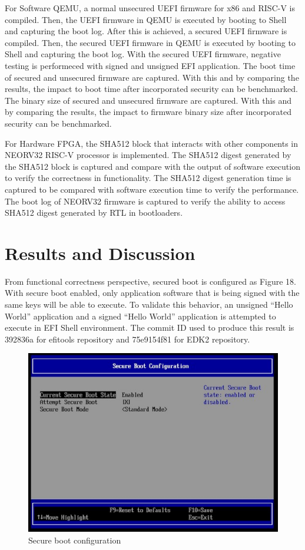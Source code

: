 \documentclass[review]{elsarticle}
\begin{document}
For Software QEMU, a normal unsecured UEFI firmware for x86 and RISC-V is compiled. Then, the UEFI firmware in QEMU is executed by booting to Shell and capturing the boot log.
After this is achieved, a secured UEFI firmware is compiled. Then, the secured UEFI firmware in QEMU is executed by booting to Shell and capturing the boot log.
With the secured UEFI firmware, negative testing is performeced with signed and unsigned EFI application.
The boot time of secured and unsecured firmware are captured. With this and by comparing the results, the impact to boot time after incorporated security can be benchmarked.
The binary size of secured and unsecured firmware are captured. With this and by comparing the results, the impact to firmware binary size after incorporated security can be benchmarked.

For Hardware FPGA, the SHA512 block that interacts with other components in NEORV32 RISC-V processor is implemented.
The SHA512 digest generated by the SHA512 block is captured and compare with the output of software execution to verify the correctness in functionality.
The SHA512 digest generation time is captured to be compared with software execution time to verify the performance.
The boot log of NEORV32 firmware is captured to verify the ability to access SHA512 digest generated by RTL in bootloaders.


\section{ Results and Discussion}
From functional correctness perspective, secured boot is configured as Figure 18. With secure boot enabled, only application software that is being signed with the same keys will be able to execute. To validate this behavior, an unsigned “Hello World” application and a signed “Hello World” application is attempted to execute in EFI Shell environment. The commit ID used to produce this result is 392836a for efitools repository and 75e9154f81 for EDK2 repository.

\begin{figure}[hbt!]
	\centering
	\includegraphics[width=1\textwidth]{figs/SecureBootConfiguration.JPG}
	\caption{Secure boot configuration}
\end{figure}
\end{document}
